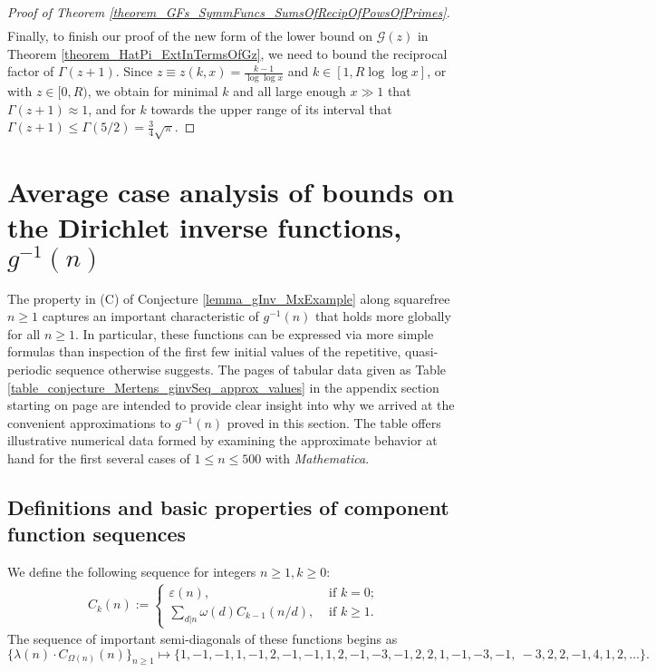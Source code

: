\documentclass[11pt,reqno,a4letter]{article}
\numberwithin{figure}{section}
\numberwithin{table}{section}
\newcommand{\seqnum}[1]{\href{http://oeis.org/#1}{\color{ProcessBlue}{\underline{#1}}}}
\theoremstyle{plain}
\numberwithin{theorem}{section}
\theoremstyle{definition}
\begin{document}
\begin{proof}[Proof of Theorem \ref{theorem_GFs_SymmFuncs_SumsOfRecipOfPowsOfPrimes}]
\begin{align*}
     \end{align*} 
Finally, to finish our proof of the new form of the lower bound on $\mathcal{G}(z)$ in 
Theorem \ref{theorem_HatPi_ExtInTermsOfGz}, 
we need to bound the reciprocal factor of $\Gamma(z+1)$. 
Since $z \equiv z(k, x) = \frac{k-1}{\log\log x}$ and 
$k \in [1, R\log\log x]$, or with $z \in [0, R)$, 
we obtain for minimal $k$ and all large enough $x \gg 1$ that 
$\Gamma(z+1) \approx 1$, and for $k$ towards the upper range of 
its interval that $\Gamma(z+1) \leq \Gamma(5/2) = \frac{3}{4} \sqrt{\pi}$. 
\end{proof} 

\newpage
\section{Average case analysis of bounds on the Dirichlet inverse functions, $g^{-1}(n)$} 
\label{Section_InvFunc_PreciseExpsAndAsymptotics} 

The property in (C) of 
Conjecture \ref{lemma_gInv_MxExample} along squarefree $n \geq 1$ 
captures an important characteristic of $g^{-1}(n)$ that holds more globally 
for all $n \geq 1$. In particular, these 
functions can be expressed via more simple formulas than inspection of the 
first few initial values of the repetitive, quasi-periodic sequence otherwise suggests. 
The pages of tabular data given as Table \ref{table_conjecture_Mertens_ginvSeq_approx_values} 
in the appendix section starting on 
page \pageref{table_conjecture_Mertens_ginvSeq_approx_values} are intended to 
provide clear insight into why we arrived at the convenient approximations to 
$g^{-1}(n)$ proved in this section. The table offers illustrative 
numerical data formed by examining the approximate behavior 
at hand for the first several cases of $1 \leq n \leq 500$ with \emph{Mathematica}. 

\subsection{Definitions and basic properties of component function sequences} 

We define the following sequence for integers $n \geq 1, k \geq 0$: 
\begin{align} 
\label{eqn_CknFuncDef_v2} 
C_k(n) := \begin{cases} 
     \varepsilon(n), & \text{ if $k = 0$; } \\ 
     \sum\limits_{d|n} \omega(d) C_{k-1}(n/d), & \text{ if $k \geq 1$. } 
     \end{cases} 
\end{align} 
The sequence of important semi-diagonals of these functions begins as 
\cite[\seqnum{A008480}]{OEIS} 
\[
\{\lambda(n) \cdot C_{\Omega(n)}(n) \}_{n \geq 1} \mapsto \{
     1, -1, -1, 1, -1, 2, -1, -1, 1, 2, -1, -3, -1, 2, 2, 1, -1, -3, -1, \
     -3, 2, 2, -1, 4, 1, 2, \ldots \}. 
\]
\end{document}
